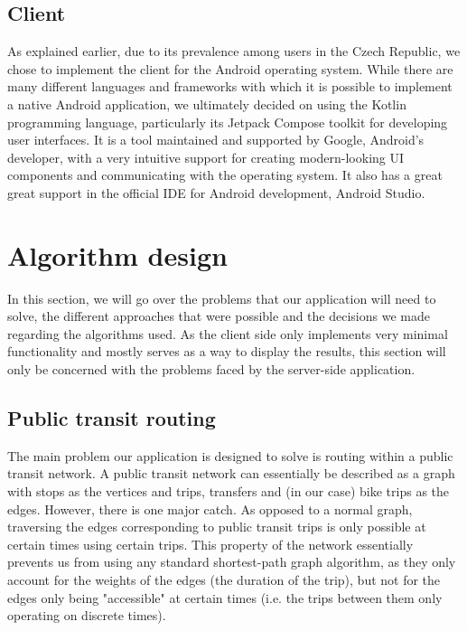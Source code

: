 \subsection{Client}

As explained earlier, due to its prevalence among users in the Czech Republic, we chose to implement the client for the Android operating system. While there are many different languages and frameworks with which it is possible to implement a native Android application, we ultimately decided on using the Kotlin programming language, particularly its Jetpack Compose toolkit for developing user interfaces. It is a tool maintained and supported by Google, Android's developer, with a very intuitive support for creating modern-looking UI components and communicating with the operating system. It also has a great great support in the official IDE for Android development, Android Studio.


\section{Algorithm design}

In this section, we will go over the problems that our application will need to solve, the different approaches that were possible and the decisions we made regarding the algorithms used. As the client side only implements very minimal functionality and mostly serves as a way to display the results, this section will only be concerned with the problems faced by the server-side application.

\subsection{Public transit routing}

The main problem our application is designed to solve is routing within a public transit network. A public transit network can essentially be described as a graph with stops as the vertices and trips, transfers and (in our case) bike trips as the edges.  However, there is one major catch. As opposed to a normal graph, traversing the edges corresponding to public transit trips is only possible at certain times using certain trips. This property of the network essentially prevents us from using any standard shortest-path graph algorithm, as they only account for the weights of the edges (the duration of the trip), but not for the edges only being "accessible" at certain times (i.e. the trips between them only operating on discrete times). 

